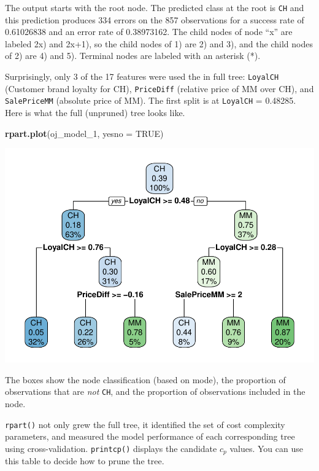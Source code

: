 \documentclass[]{book}
\newenvironment{Shaded}{\begin{snugshade}}{\end{snugshade}}
\newcommand{\DataTypeTok}[1]{\textcolor[rgb]{0.13,0.29,0.53}{#1}}
\newcommand{\DecValTok}[1]{\textcolor[rgb]{0.00,0.00,0.81}{#1}}
\newcommand{\KeywordTok}[1]{\textcolor[rgb]{0.13,0.29,0.53}{\textbf{#1}}}
\newcommand{\NormalTok}[1]{#1}
\newcommand{\OtherTok}[1]{\textcolor[rgb]{0.56,0.35,0.01}{#1}}
\begin{document}
The output starts with the root node. The predicted class at the root is \texttt{CH} and this prediction produces 334 errors on the 857 observations for a success rate of 0.61026838 and an error rate of 0.38973162. The child nodes of node ``x'' are labeled 2x) and 2x+1), so the child nodes of 1) are 2) and 3), and the child nodes of 2) are 4) and 5). Terminal nodes are labeled with an asterisk (*).

Surprisingly, only 3 of the 17 features were used the in full tree: \texttt{LoyalCH} (Customer brand loyalty for CH), \texttt{PriceDiff} (relative price of MM over CH), and \texttt{SalePriceMM} (absolute price of MM). The first split is at \texttt{LoyalCH} = 0.48285. Here is what the full (unpruned) tree looks like.

\begin{Shaded}
\begin{Highlighting}[]
\KeywordTok{rpart.plot}\NormalTok{(oj_model_}\DecValTok{1}\NormalTok{, }\DataTypeTok{yesno =} \OtherTok{TRUE}\NormalTok{)}
\end{Highlighting}
\end{Shaded}

\includegraphics{data-sci_files/figure-latex/unnamed-chunk-26-1.pdf}

The boxes show the node classification (based on mode), the proportion of observations that are \emph{not} \texttt{CH}, and the proportion of observations included in the node.

\texttt{rpart()} not only grew the full tree, it identified the set of cost complexity parameters, and measured the model performance of each corresponding tree using cross-validation. \texttt{printcp()} displays the candidate \(c_p\) values. You can use this table to decide how to prune the tree.
\end{document}
